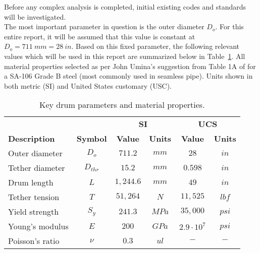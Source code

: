 \label{chapt:standards}

Before any complex analysis is completed, initial existing codes and standards will be investigated.\\


The most important parameter in question is the outer diameter $D_o$. For this entire report, it will be assumed that this value is constant at $D_o = 711\ mm = 28\ in$. Based on this fixed parameter, the following relevant values which will be used in this report are summarized below in Table~\ref{table:prelim_params}. All material properties selected as per John Umina's  suggestion from Table 1A of \citep{ASMEbvpcIID} for a SA-106 Grade B steel (most commonly used in seamless pipe). Units shown in both metric (SI) and United States customary (USC).\\

\begin{table}[ht]
	\caption{Key drum parameters and material properties.}
	\centering
    \begin{tabular}{lccccc}
          &       & \multicolumn{2}{c}{\textbf{SI}} & \multicolumn{2}{c}{\textbf{UCS}} \\
	\cmidrule{3-6}    \textbf{Description} & \textbf{Symbol} & \textbf{Value} & \textbf{Units} & \textbf{Value} & \textbf{Units} \\
    \midrule
    Outer diameter & $D_o$ & $711.2$ & $mm$  & $28$ & $in$ \\
    Tether diameter & $D_{thr}$ & $15.2$ & $mm$  & $0.598$ & $in$ \\
    Drum length & $L$   & $1,244.6$ & $mm$  & $49$ & $in$ \\
    Tether tension & $T$   & $51,264$ & $N$   & $11,525$ & $lbf$ \\
    Yield strength & $S_y$ & $241.3$ & $MPa$ & $35,000$ & $psi$ \\
    Young's modulus & $E$   & $200$ & $GPa$ & $2.9\cdot 10^7$ & $psi$ \\
    Poisson's ratio & $\nu$ & $0.3$ & $ul$  & $-$    & $-$ \\
    \end{tabular}%
  \label{table:prelim_params}
\end{table}

